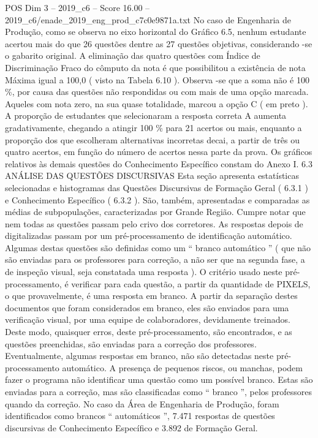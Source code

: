 \begin{textsample}{POS Dim 3 – 2019\_c6 – Score 16.00 – 2019\_c6/enade\_2019\_eng\_prod\_c7c0e9871a.txt}
No caso de Engenharia de Produção, como se observa no eixo horizontal do Gráfico 6.5, nenhum estudante acertou mais do que 26 questões dentre as 27 questões objetivas, considerando -se o gabarito original.
A eliminação das quatro questões com Índice de Discriminação Fraco do cômputo da nota é que possibilitou a existência de nota Máxima igual a 100,0 ( visto na Tabela 6.10 ).
Observa -se que a soma não é 100 \%, por causa das questões não respondidas ou com mais de uma opção marcada.
Aqueles com nota zero, na sua quase totalidade, marcou a opção C ( em preto ).
A proporção de estudantes que selecionaram a resposta correta A aumenta gradativamente, chegando a atingir 100 \% para 21 acertos ou mais, enquanto a proporção dos que escolheram alternativas incorretas decai, a partir de três ou quatro acertos, em função do número de acertos nessa parte da prova.
Os gráficos relativos às demais questões do Conhecimento Específico constam do Anexo I. 6.3 ANÁLISE DAS QUESTÕES DISCURSIVAS Esta seção apresenta estatísticas selecionadas e histogramas das Questões Discursivas de Formação Geral ( 6.3.1 ) e Conhecimento Específico ( 6.3.2 ).
São, também, apresentadas e comparadas as médias de subpopulações, caracterizadas por Grande Região.
Cumpre notar que nem todas as questões passam pelo crivo dos corretores.
As respostas depois de digitalizadas passam por um pré-processamento de identificação automático.
Algumas destas questões são definidas como um “ branco automático ” ( que não são enviadas para os professores para correção, a não ser que na segunda fase, a de inspeção visual, seja constatada uma resposta ).
O critério usado neste pré-processamento, é verificar para cada questão, a partir da quantidade de PIXELS, o que provavelmente, é uma resposta em branco.
A partir da separação destes documentos que foram considerados em branco, eles são enviados para uma verificação visual, por uma equipe de colaboradores, devidamente treinados.
Deste modo, quaisquer erros, deste pré-processamento, são encontrados, e as questões preenchidas, são enviadas para a correção dos professores.
Eventualmente, algumas respostas em branco, não são detectadas neste pré-processamento automático.
A presença de pequenos riscos, ou manchas, podem fazer o programa não identificar uma questão como um possível branco.
Estas são enviadas para a correção, mas são classificadas como “ branco ”, pelos professores quando da correção.
No caso da Área de Engenharia de Produção, foram identificados como brancos “ automáticos ”, 7.471 respostas de questões discursivas de Conhecimento Específico e 3.892 de Formação Geral.

\end{textsample}
